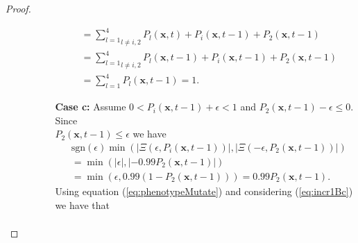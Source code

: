 \documentclass[\main/thesis.tex]{subfiles}
\begin{document}
\begin{proof}
\begin{itemize}
\begin{itemize}
\begin{itemize}
\begin{align*}
                             	                       &{=} \underset{l {\ne} i, 2}{\sum_{l{=}1}^4} P_l(\boldsymbol{x}, t)
                             	                        {+} P_i(\boldsymbol{x}, t{-}1) {+} P_2(\boldsymbol{x}, t{-}1) \\
                             	                       &{=} \underset{l {\ne} i, 2}{\sum_{l{=}1}^4}P_l(\boldsymbol{x},t{-}1) 
                             	                        {+} P_i(\boldsymbol{x}, t{-}1) {+} P_2(\boldsymbol{x}, t{-}1) \\
                             	                       &{=} \sum_{l{=}1}^4 P_l(\boldsymbol{x}, t{-}1) {=} 1.
                             	                     \end{align*}
                             	\item[{\bf Case c:}] Assume $0 {<} P_i(\boldsymbol{x}, t{-}1) {+} \epsilon {<} 1$ 
                             	                     and $P_2(\boldsymbol{x}, t{-}1) {-} \epsilon {\le} 0$. Since\\
                             	                     $P_2(\boldsymbol{x}, t{-}1) {\le} \epsilon$ we have
                             	                     \begin{align*}
                             	                       &\text{sgn}(\epsilon) \min(|\Xi(\epsilon,P_i(\boldsymbol{x},t{-}1))|, 
                             	                                                  |\Xi({-}\epsilon,
                             	                                                       P_2(\boldsymbol{x},t{-}1))|)
                             	                       \\ 
                             	                       &{=} \min(|\epsilon|, |-0.99 P_2(\boldsymbol{x}, t{-}1)|) \\
                             	                       &{=} \min(\epsilon, 0.99 (1{-}P_2(\boldsymbol{x}, t{-}1))) 
                             	                        {=} 0.99 P_2(\boldsymbol{x}, t{-}1).
                             	                       \tag{14}
                             	                       \label{eq:incr1Bc}
                             	                     \end{align*}
                             	                     Using equation (\ref{eq:phenotypeMutate}) and considering 
                             	                     (\ref{eq:incr1Bc}) we have that
                             	                     \begin{align*}

\end{align*}
\end{itemize}
\end{itemize}
\end{itemize}
\end{proof}
\end{document}
